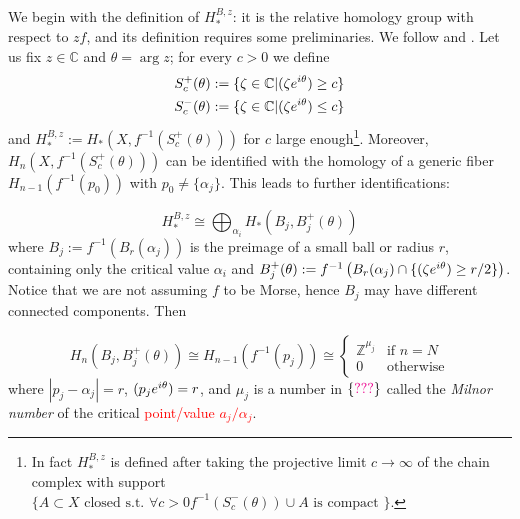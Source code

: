 \documentclass{article}
\let\Re\relax
\DeclareMathOperator{\Re}{Re}
\theoremstyle{definition}
\newcommand{\Z}{\mathbb{Z}}
\newcommand{\C}{\mathbb{C}}
\begin{document}
We begin with the definition of $H_{*}^{B,z}$: it is the relative homology group with respect to $zf$, and its definition requires some preliminaries. We follow \cite{pham} and \cite[Section 1]{Arnold}. Let us fix $z\in\C$ and $\theta=\arg z$; for every $c>0$ we define 
\begin{align*}
    S_c^+(\theta) &:=\lbrace \zeta\in\C \vert \Re (\zeta e^{i\theta})\geq c \rbrace\\
    S_c^-(\theta)&:=\lbrace \zeta\in\C \vert \Re (\zeta e^{i\theta})\leq c \rbrace
\end{align*}
and $H_{*}^{B,z}:=H_{*}(X,f^{-1}(S_c^+(\theta)))$ for $c$ large enough\footnote{In fact $H_{*}^{B,z}$ is defined after taking the projective limit $c\to\infty$ of the chain complex with support $\{A\subset X \text{ closed s.t. } \forall c>0 f^{-1}(S_c^-(\theta))\cup A \text{ is compact }  \}$.}. Moreover, $H_n(X,f^{-1}(S_c^+(\theta)))$ can be identified with the homology of a generic fiber $H_{n-1}(f^{-1}(p_0))$ with $p_0\neq \{\alpha_j\}$. This leads to further identifications:

\begin{equation}
    H_{*}^{B,z}\cong \bigoplus_{\alpha_i} H_{*}(B_j, B_j^+(\theta))
\end{equation}
where $B_j:=f^{-1}(B_r(\alpha_j))$ is the preimage of a small ball or radius $r$, containing only the critical value $\alpha_i$ and $B_j^+(\theta):=f^{-1}\left(B_r(\alpha_j)\cap \{ \Re (\zeta e^{i\theta})\geq r/2\}\right)$. Notice that we are not assuming $f$ to be Morse, hence $B_j$ may have different connected components. Then 

\begin{equation}
    H_{n}(B_j, B_j^+(\theta))\cong H_{n-1}(f^{-1}(p_j))\cong \begin{cases} \Z^{\mu_j} & \text{if } n=N\\
     0 & \text{otherwise}
    \end{cases}
\end{equation}
where $|p_j-\alpha_j|=r$, $\Re(p_j e^{i\theta})=r$, and $\mu_j$ is a number in $\{\textcolor{magenta}{???}\}$ called the {\em Milnor number} of the critical \textcolor{red}{point/value $a_j/\alpha_j$}. 
\end{document}
